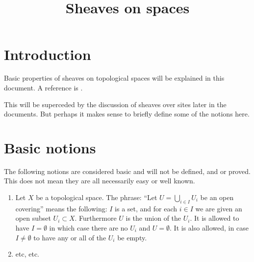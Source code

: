 

%


\title{Sheaves on spaces}


\maketitle

\tableofcontents

\section{Introduction}
\label{section-introduction}

\noindent
Basic properties of sheaves on topological spaces
will be explained in this document.
A reference is \cite{Godement}.

\medskip\noindent
This will be superceded by the discussion of sheaves
over sites later in the documents. But perhaps it makes 
sense to briefly define some of the notions here.











\section{Basic notions}
\label{section-sheaves-basic}

\noindent
The following notions are considered basic and will not be defined,
and or proved. This does not mean they are all necessarily easy or 
well known.

\begin{enumerate}
\item Let $X$ be a topological space. The phrase: ``Let
$U = \bigcup_{i \in I} U_i$ be an open covering'' means the
following: $I$ is a set, and for each $i \in I$ we are given
an open subset $U_i \subset X$. Furthermore $U$ is the 
union of the $U_i$. It is allowed to have $I = \emptyset$
in which case there are no $U_i$ and $U = \emptyset$.
It is also allowed, in case $I \not= \emptyset$ to have
any or all of the $U_i$ be empty.
\item etc, etc.
\end{enumerate}












